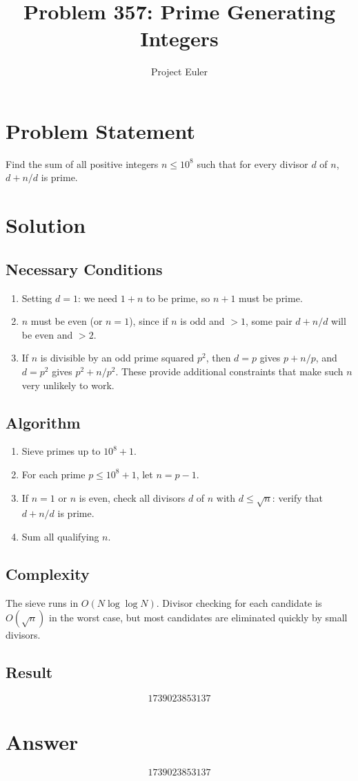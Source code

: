 \documentclass{article}
\title{Problem 357: Prime Generating Integers}
\author{Project Euler}
\date{}
\begin{document}
\maketitle

\section{Problem Statement}
Find the sum of all positive integers $n \leq 10^8$ such that for every divisor $d$ of $n$,
$d + n/d$ is prime.

\section{Solution}

\subsection{Necessary Conditions}
\begin{enumerate}
    \item Setting $d = 1$: we need $1 + n$ to be prime, so $n + 1$ must be prime.
    \item $n$ must be even (or $n = 1$), since if $n$ is odd and $> 1$, some pair
          $d + n/d$ will be even and $> 2$.
    \item If $n$ is divisible by an odd prime squared $p^2$, then $d = p$ gives
          $p + n/p$, and $d = p^2$ gives $p^2 + n/p^2$. These provide additional
          constraints that make such $n$ very unlikely to work.
\end{enumerate}

\subsection{Algorithm}
\begin{enumerate}
    \item Sieve primes up to $10^8 + 1$.
    \item For each prime $p \leq 10^8 + 1$, let $n = p - 1$.
    \item If $n = 1$ or $n$ is even, check all divisors $d$ of $n$ with $d \leq \sqrt{n}$:
          verify that $d + n/d$ is prime.
    \item Sum all qualifying $n$.
\end{enumerate}

\subsection{Complexity}
The sieve runs in $O(N \log \log N)$. Divisor checking for each candidate is $O(\sqrt{n})$
in the worst case, but most candidates are eliminated quickly by small divisors.

\subsection{Result}
\[
\boxed{1739023853137}
\]

\section{Answer}

\[
\boxed{1739023853137}
\]
\end{document}
